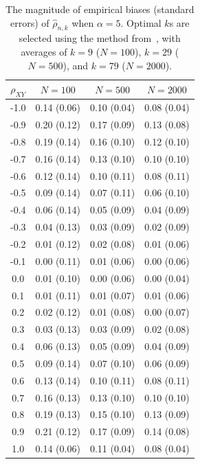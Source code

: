 \documentclass[lineno]{biometrika}
\newcommand \ag{\alpha}
\begin{document}
\begin{table}[ht]
\centering
\caption{The magnitude of empirical biases (standard errors) of $\hat{\rho}_{n,k}$ when $\ag=5$. Optimal $k$s are selected using the method from~\citet{danielsson:Ergun:deHaan:deVries:2016}, with averages of $k=9$ ($N=100$), $k=29$ ($N=500$), and  $k=79$ ($N=2000$).
\label{t:sim4}}
\medskip
\begin{tabular}{cccc}
  \hline\hline
 $\rho_{XY}$ & $N=100$ &  $N=500$ & $N=2000$  \\
  \hline
-1.0 & 0.14 (0.06) & 0.10 (0.04) & 0.08 (0.04) \\
-0.9 & 0.20 (0.12) & 0.17 (0.09) & 0.13 (0.08) \\
-0.8 & 0.19 (0.14) & 0.16 (0.10) & 0.12 (0.10) \\
-0.7 & 0.16 (0.14) & 0.13 (0.10) & 0.10 (0.10) \\
-0.6 & 0.12 (0.14) & 0.10 (0.11) & 0.08 (0.11) \\
-0.5 & 0.09 (0.14) & 0.07 (0.11) & 0.06 (0.10) \\
-0.4 & 0.06 (0.14) & 0.05 (0.09) & 0.04 (0.09) \\
-0.3 & 0.04 (0.13) & 0.03 (0.09) & 0.02 (0.09) \\
-0.2 & 0.01 (0.12) & 0.02 (0.08) & 0.01 (0.06) \\
-0.1 & 0.00 (0.11) & 0.01 (0.06) & 0.00 (0.06) \\
0.0 & 0.01 (0.10) & 0.00 (0.06) & 0.00 (0.04) \\
0.1 & 0.01 (0.11) & 0.01 (0.07) & 0.01 (0.06) \\
0.2 & 0.02 (0.12) & 0.01 (0.08) & 0.00 (0.07) \\
0.3 & 0.03 (0.13) & 0.03 (0.09) & 0.02 (0.08) \\
0.4 & 0.06 (0.13) & 0.05 (0.09) & 0.04 (0.09) \\
0.5 & 0.09 (0.14) & 0.07 (0.10) & 0.06 (0.09) \\
0.6 & 0.13 (0.14) & 0.10 (0.11) & 0.08 (0.11) \\
0.7 & 0.16 (0.13) & 0.13 (0.10) & 0.10 (0.10) \\
0.8 & 0.19 (0.13) & 0.15 (0.10) & 0.13 (0.09) \\
0.9 & 0.21 (0.12) & 0.17 (0.09) & 0.14 (0.08) \\
1.0 & 0.14 (0.06) & 0.11 (0.04) & 0.08 (0.04) \\
\hline\hline
\end{tabular}
\end{table}
\end{document}
